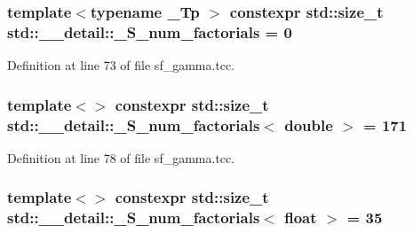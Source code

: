 \subsubsection[{\texorpdfstring{\+\_\+\+S\+\_\+num\+\_\+factorials}{_S_num_factorials}}]{\setlength{\rightskip}{0pt plus 5cm}template$<$typename \+\_\+\+Tp $>$ constexpr std\+::size\+\_\+t std\+::\+\_\+\+\_\+detail\+::\+\_\+\+S\+\_\+num\+\_\+factorials = 0}\hypertarget{namespacestd_1_1____detail_a671f3ba94c1b06be87992486bca37426}{}\label{namespacestd_1_1____detail_a671f3ba94c1b06be87992486bca37426}


Definition at line 73 of file sf\+\_\+gamma.\+tcc.

\subsubsection[{\texorpdfstring{\+\_\+\+S\+\_\+num\+\_\+factorials$<$ double $>$}{_S_num_factorials< double >}}]{\setlength{\rightskip}{0pt plus 5cm}template$<$$>$ constexpr std\+::size\+\_\+t {\bf std\+::\+\_\+\+\_\+detail\+::\+\_\+\+S\+\_\+num\+\_\+factorials}$<$ double $>$ = 171}\hypertarget{namespacestd_1_1____detail_ad415b9ec36471d7aca4ebcd22cb7b216}{}\label{namespacestd_1_1____detail_ad415b9ec36471d7aca4ebcd22cb7b216}


Definition at line 78 of file sf\+\_\+gamma.\+tcc.

\subsubsection[{\texorpdfstring{\+\_\+\+S\+\_\+num\+\_\+factorials$<$ float $>$}{_S_num_factorials< float >}}]{\setlength{\rightskip}{0pt plus 5cm}template$<$$>$ constexpr std\+::size\+\_\+t {\bf std\+::\+\_\+\+\_\+detail\+::\+\_\+\+S\+\_\+num\+\_\+factorials}$<$ float $>$ = 35}\hypertarget{namespacestd_1_1____detail_a3a29651303ca2222246ef6f0a17e92ec}{}\label{namespacestd_1_1____detail_a3a29651303ca2222246ef6f0a17e92ec}


